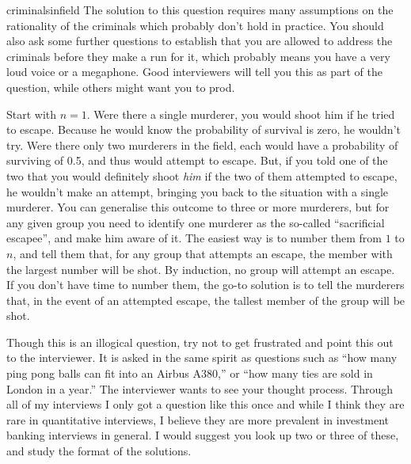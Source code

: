 \begin{answer}{criminalsinfield}
  The solution to this question requires many assumptions on the rationality of the criminals which probably don't hold in practice.
  You should also ask some further questions to establish that you are allowed to address the criminals before they make a run for it, which probably means you have a very loud voice or a megaphone.
  Good interviewers will tell you this as part of the question, while others might want you to prod.

  Start with $n=1$.
  Were there a single murderer, you would shoot him if he tried to escape.
  Because he would know the probability of survival is zero, he wouldn't try.
  Were there only two murderers in the field, each would have a probability of surviving of 0.5, and thus would attempt to escape.
  But, if you told one of the two that you would definitely shoot \emph{him} if the two of them attempted to escape, he wouldn't make an attempt, bringing you back to the situation with a single murderer.
  You can generalise this outcome to three or more murderers, but for any given group you need to identify one murderer as the so-called ``sacrificial escapee'', and make him aware of it.
  The easiest way is to number them from $1$ to $n$, and tell them that, for any group that attempts an escape, the member with the largest number will be shot.
  By induction, no group will attempt an escape.
  If you don't have time to number them, the go-to solution is to tell the murderers that, in the event of an attempted escape, the tallest member of the group will be shot.

  Though this is an illogical question, try not to get frustrated and point this out to the interviewer.
  It is asked in the same spirit as questions such as ``how many ping pong balls can fit into an Airbus A380,'' or ``how many ties are sold in London in a year.''
  The interviewer wants to see your thought process.
  Through all of my interviews I only got a question like this once and while I think they are rare in quantitative interviews, I believe they are more prevalent in investment banking interviews in general.
  I would suggest you look up two or three of these, and study the format of the solutions.
\end{answer}

